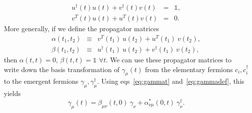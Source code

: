 \documentclass[a4paper,10pt]{article}
\begin{document}
\begin{eqnarray}
\label{eq:fermionicgamma}
u^\dagger(t) u(t) + v^\dagger(t) v(t) &=& \mathds{1},\nonumber \\
v^T(t)u(t)+u^T(t)v(t) &=& 0.
\end{eqnarray}
More generally, if we define the propagator matrices
\begin{eqnarray}
\alpha(t_1,t_2) &\equiv& v^T(t_1) \ u(t_2) + u^T(t_1) \ v(t_2),\nonumber \\
\beta(t_1,t_2)  &\equiv& u^\dagger(t_1) \ u(t_2) + v^\dagger(t_1) \ v(t_2),
\end{eqnarray}
then $\alpha(t,t)=0$, $\beta(t,t)=\mathds{1}$ $\forall t$. We can use these propagator matrices to write down the basis transformation of $\gamma_\mu(t)$ from the elementary fermions $c_i,c^\dagger_i$ to the emergent fermions $\gamma_\mu,\gamma^\dagger_\mu$. Using eqs~\ref{eq:gammat} and~\ref{eq:gammadef}, this yields
\begin{equation}
\label{eq:emergentbasis}
\gamma_\mu(t) = \beta^{\ }_{\mu\nu}(t,0) \ \gamma_\nu + \alpha^\ast_{\nu\mu}(0,t) \ \gamma^\dagger_\nu. 
\end{equation}
\end{document}
